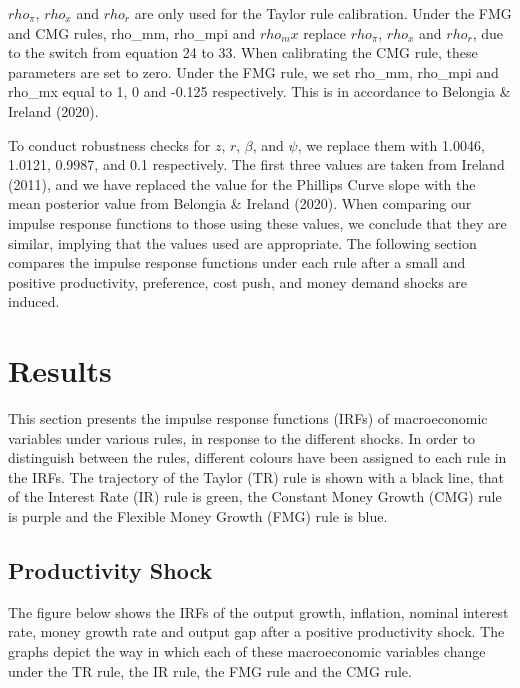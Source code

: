 \documentclass[11pt,preprint, authoryear]{elsarticle}
\numberwithin{equation}{section}
\numberwithin{figure}{section}
\numberwithin{table}{section}
\begin{document}
\(rho_\pi\), \(rho_x\) and \(rho_r\) are only used for the Taylor rule
calibration. Under the FMG and CMG rules, rho\_mm, rho\_mpi and
\(rho_mx\) replace \(rho_\pi\), \(rho_x\) and \(rho_r\), due to the
switch from equation 24 to 33. When calibrating the CMG rule, these
parameters are set to zero. Under the FMG rule, we set rho\_mm, rho\_mpi
and rho\_mx equal to 1, 0 and -0.125 respectively. This is in accordance
to Belongia \& Ireland (2020).

To conduct robustness checks for \(z\), \(r\), \(\beta\), and \(\psi\),
we replace them with 1.0046, 1.0121, 0.9987, and 0.1 respectively. The
first three values are taken from Ireland (2011), and we have replaced
the value for the Phillips Curve slope with the mean posterior value
from Belongia \& Ireland (2020). When comparing our impulse response
functions to those using these values, we conclude that they are
similar, implying that the values used are appropriate. The following
section compares the impulse response functions under each rule after a
small and positive productivity, preference, cost push, and money demand
shocks are induced.

\newpage

\hypertarget{results}{%
\section{Results}\label{results}}

This section presents the impulse response functions (IRFs) of
macroeconomic variables under various rules, in response to the
different shocks. In order to distinguish between the rules, different
colours have been assigned to each rule in the IRFs. The trajectory of
the Taylor (TR) rule is shown with a black line, that of the Interest
Rate (IR) rule is green, the Constant Money Growth (CMG) rule is purple
and the Flexible Money Growth (FMG) rule is blue.

\hypertarget{productivity-shock}{%
\subsection{Productivity Shock}\label{productivity-shock}}

The figure below shows the IRFs of the output growth, inflation, nominal
interest rate, money growth rate and output gap after a positive
productivity shock. The graphs depict the way in which each of these
macroeconomic variables change under the TR rule, the IR rule, the FMG
rule and the CMG rule.
\end{document}

